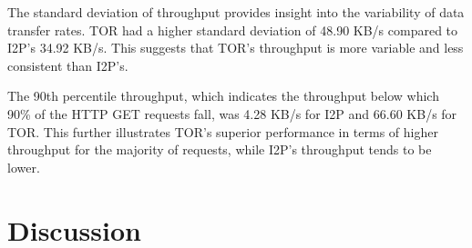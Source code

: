 \documentclass[12pt,conference]{IEEEtran}
\begin{document}
The standard deviation of throughput provides insight into the variability of data transfer rates. TOR had a higher standard deviation of 48.90 KB/s compared to I2P's 34.92 KB/s. This suggests that TOR's throughput is more variable and less consistent than I2P's.

The 90th percentile throughput, which indicates the throughput below which 90\% of the HTTP GET requests fall, was 4.28 KB/s for I2P and 66.60 KB/s for TOR. This further illustrates TOR's superior performance in terms of higher throughput for the majority of requests, while I2P's throughput tends to be lower.
\section{Discussion}



\end{document}
